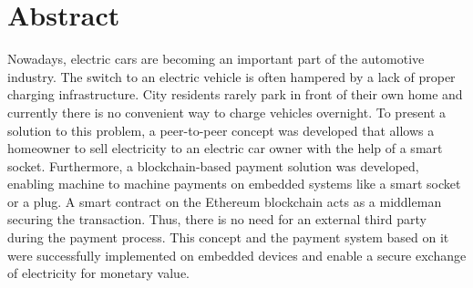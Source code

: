 \thispagestyle{empty}

\section*{Abstract}

Nowadays, electric cars are becoming an important part of the automotive industry.
The switch to an electric vehicle is often hampered by a lack of proper charging infrastructure.
City residents rarely park in front of their own home and currently there is no convenient way to charge vehicles overnight.
To present a solution to this problem, a peer-to-peer concept was developed that allows a homeowner to sell electricity to an electric car owner with the help of a smart socket.
Furthermore, a blockchain-based payment solution was developed, enabling machine to machine payments on embedded systems like a smart socket or a plug.
A smart contract on the Ethereum blockchain acts as a middleman securing the transaction.
Thus, there is no need for an external third party during the payment process.
This concept and the payment system based on it were successfully implemented on embedded devices and enable a secure exchange of electricity for monetary value.